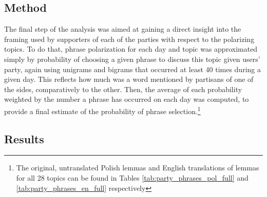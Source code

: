 \documentclass{article}
\begin{document}
	\subsection*{Method}
	
	The final step of the analysis was aimed at gaining a direct insight into the framing used by supporters of each of the parties with respect to the polarizing topics. To do that, phrase polarization for each day and topic was approximated simply by probability of choosing a given phrase to discuss this topic given users’ party, again using unigrams and bigrams that occurred at least 40 times during a given day. This reflects how much was a word mentioned by partisans of one of the sides, comparatively to the other. Then, the average of each probability weighted by the number a phrase has occurred on each day was computed, to provide a final estimate of the probability of phrase selection.\footnote{The original, untranslated Polish lemmas and English translations of lemmas for all 28 topics can be found in Tables \ref{tab:party_phrases_pol_full} and \ref{tab:party_phrases_en_full} respectively}
	
	\subsection*{Results}
	
\end{document}
